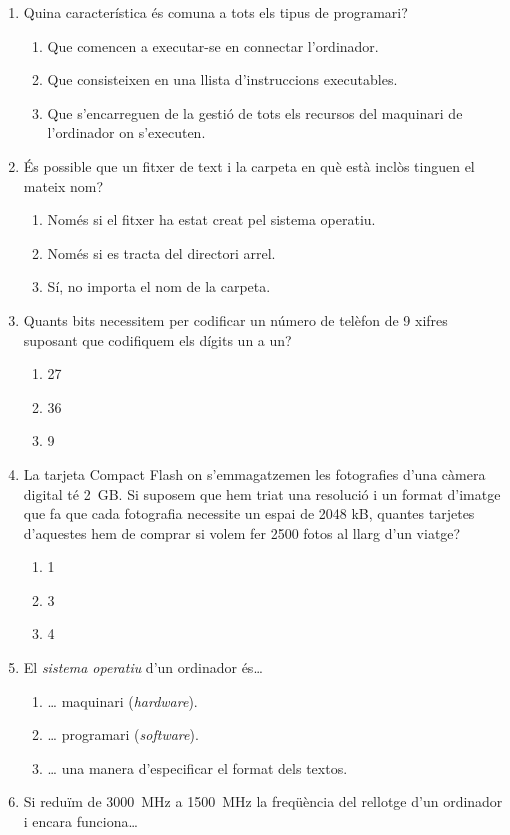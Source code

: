 \begin{enumerate}
\item Quina característica és comuna a tots els tipus de programari?
  
\begin{enumerate}
\item Que comencen a executar-se en connectar l'ordinador.
\item Que consisteixen en una llista d'instruccions executables.
\item Que s'encarreguen de la gestió de tots els recursos del 
      maquinari de l'ordinador on s'executen.
\end{enumerate}

\item És possible que un fitxer de text i la carpeta en què està
  inclòs tinguen el mateix nom?
  
\begin{enumerate}
\item Només si el fitxer ha estat creat pel sistema operatiu.
\item Només si es tracta del directori arrel.
\item Sí, no importa el nom de la carpeta.
\end{enumerate}

\item Quants bits necessitem per codificar un número de telèfon de 9
xifres suposant que codifiquem els dígits un a un?
\begin{enumerate}
\item 27
\item 36
\item 9
\end{enumerate}

\item La tarjeta Compact Flash on s'emmagatzemen les fotografies d'una
   càmera digital té 2~GB. Si suposem que hem triat una
  resolució i un format d'imatge que fa que cada fotografia necessite
  un espai de 2048 kB, quantes tarjetes d'aquestes hem de comprar si
  volem fer 2500 fotos al llarg d'un viatge?
\begin{enumerate}
\item 1
\item 3
\item 4
\end{enumerate}

\item El \emph{sistema operatiu} d'un ordinador és{\ldots}
   
\begin{enumerate}
\item {\ldots} maquinari (\emph{hardware}).
\item {\ldots} programari (\emph{software}).
\item {\ldots} una manera d'especificar el format dels textos.
\end{enumerate}
\item Si reduïm de 3000~MHz a 1500~MHz la freqüència del rellotge
   d'un ordinador i encara funciona{\ldots}
   

\end{enumerate}

